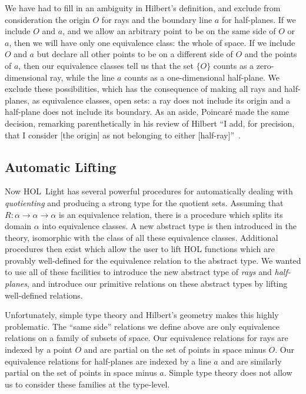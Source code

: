 We have had to fill in an ambiguity in Hilbert's definition, and exclude from consideration the origin $O$ for rays and the boundary line $a$ for half-planes. If we include $O$ and $a$, and we allow an arbitrary point to be on the same side of $O$ or $a$, then we will have only one equivalence class: the whole of space. If we include $O$ and $a$ but declare all other points to be on a different side of $O$ and the points of $a$, then our equivalence classes tell us that the set $\{O\}$ counts as a zero-dimensional ray, while the line $a$ counts as a one-dimensional half-plane. We exclude these possibilities, which has the consequence of making all rays and half-planes, as equivalence classes, open sets: a ray does not include its origin and a half-plane does not include its boundary. As an aside, Poincar\'{e} made the same decision, remarking parenthetically in his review of Hilbert ``I add, for precision, that I consider [the origin] as not belonging to either [half-ray]''~\cite{PoincareReview}.

\subsection{Automatic Lifting}
Now HOL~Light has several powerful procedures for automatically dealing with \emph{quotienting} and producing a strong type for the quotient sets. Assuming that $R:\alpha\rightarrow \alpha \rightarrow \alpha$ is an equivalence relation, there is a procedure which splits its domain $\alpha$ into equivalence classes. A new abstract type is then introduced in the theory, isomorphic with the class of all these equivalence classes. Additional procedures then exist which allow the user to lift HOL functions which are provably well-defined for the equivalence relation to the abstract type. We wanted to use all of these facilities to introduce the new abstract type of \emph{rays} and \emph{half-planes}, and introduce our primitive relations on these abstract types by lifting well-defined relations. 

Unfortunately, simple type theory and Hilbert's geometry makes this highly problematic. The ``same side'' relations we define above are only equivalence relations on a family of subsets of space. Our equivalence relations for rays are indexed by a point $O$ and are partial on the set of points in space minus $O$. Our equivalence relations for half-planes are indexed by a line $a$ and are similarly partial on the set of points in space minus $a$. Simple type theory does not allow us to consider these families at the type-level.

